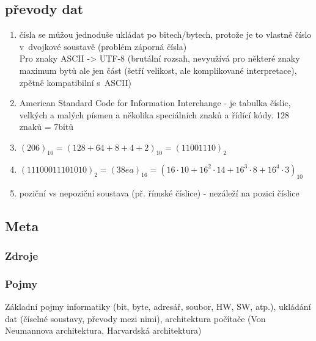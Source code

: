 \documentclass[12pt]{article}
\begin{document}
\subsection{převody dat}
\begin{enumerate}
\item čísla se můžou jednoduše ukládat po bitech/bytech, protože je to vlastně číslo v~dvojkové soustavě (problém záporná čísla)\\
Pro znaky ASCII -> UTF-8 (brutální rozsah, nevyužívá pro některé znaky maximum bytů ale jen část (šetří velikost, ale komplikované interpretace), zpětně kompatibilní s~ASCII)
\item American Standard Code for Information Interchange - je tabulka číslic, velkých a malých písmen a několika speciálních znaků a řídící kódy. 128 znaků = 7bitů
\item $(206)_10 = (128 + 64 + 8 + 4 +2)_10 = (11001110)_2$
\item $(11100011101010)_2 = (38ea)_{16} = (16 \cdot 10 + 16^2 \cdot 14 + 16^3 \cdot 8 + 16^4 \cdot 3)_10$
\item poziční vs nepoziční soustava (př. římské číslice) - nezáleží na pozici číslice
\end{enumerate}
\subsection{Meta}
\subsubsection{Zdroje}
\subsubsection{Pojmy}
Základní pojmy informatiky (bit, byte, adresář, soubor, HW, SW, atp.), ukládání dat (číselné soustavy, převody mezi nimi), architektura počítače (Von Neumannova architektura, Harvardská architektura)
\end{document}
